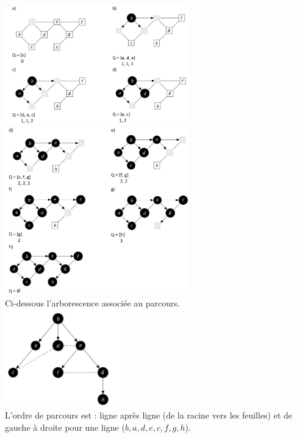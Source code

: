 \begin{Exercice}[10 minutes]
\begin{solution}
		\includegraphics[width=8cm]{solutions/BFS1.PNG}\\
		\includegraphics[width=8cm]{solutions/BFS2.PNG}\\
 		Ci-dessous l'arborescence associée au parcours.\\
		\includegraphics[width=5cm]{solutions/BFS3.PNG}\\
		L’ordre de parcours est : ligne après ligne (de la racine vers les feuilles) et
		de gauche à droite pour une ligne ($b, a, d, e, c, f, g, h$).
	\end{solution}
\end{Exercice}


